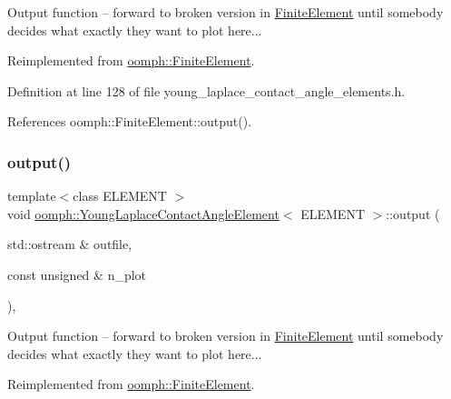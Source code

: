 Output function -- forward to broken version in \hyperlink{classoomph_1_1FiniteElement}{Finite\+Element} until somebody decides what exactly they want to plot here... 

Reimplemented from \hyperlink{classoomph_1_1FiniteElement_a2ad98a3d2ef4999f1bef62c0ff13f2a7}{oomph\+::\+Finite\+Element}.



Definition at line 128 of file young\+\_\+laplace\+\_\+contact\+\_\+angle\+\_\+elements.\+h.



References oomph\+::\+Finite\+Element\+::output().

\mbox{\label{classoomph_1_1YoungLaplaceContactAngleElement_a16968ee7e86d676783b07400a4afc61d}} 
\subsubsection{\texorpdfstring{output()}{output()}\hspace{0.1cm}{\footnotesize\ttfamily [2/4]}}
{\footnotesize\ttfamily template$<$class E\+L\+E\+M\+E\+NT $>$ \\
void \hyperlink{classoomph_1_1YoungLaplaceContactAngleElement}{oomph\+::\+Young\+Laplace\+Contact\+Angle\+Element}$<$ E\+L\+E\+M\+E\+NT $>$\+::output (\begin{DoxyParamCaption}\item[{std\+::ostream \&}]{outfile,  }\item[{const unsigned \&}]{n\+\_\+plot }\end{DoxyParamCaption})\hspace{0.3cm}{\ttfamily [inline]}, {\ttfamily [virtual]}}



Output function -- forward to broken version in \hyperlink{classoomph_1_1FiniteElement}{Finite\+Element} until somebody decides what exactly they want to plot here... 



Reimplemented from \hyperlink{classoomph_1_1FiniteElement_afa9d9b2670f999b43e6679c9dd28c457}{oomph\+::\+Finite\+Element}.



